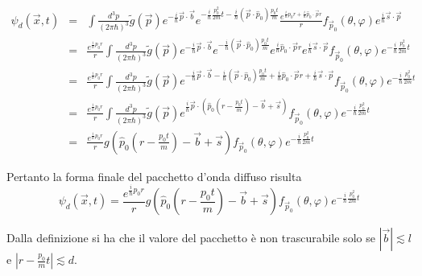 \documentclass[../../FisicaTeorica.tex]{subfiles}
\begin{document}
\begin{eqnarray*}
  \psi_d (\vec{x}, t) & = & \int \frac{d^3 p}{(2 \pi \hbar)^3}  \tilde{g}
  (\vec{p}) e^{- \frac{i}{\hbar} \vec{p} \cdot \vec{b}} e^{- \frac{i}{\hbar} 
  \frac{p_0^2}{2 m} t - \frac{i}{\hbar}  (\vec{p} \cdot \hat{p}_0) \frac{p_0
  t}{m}}  \frac{e^{\frac{i}{\hbar} p_0 r + \frac{i}{\hbar}  \hat{p}_0 \cdot
  \vec{p} r}}{r}  f_{\vec{p}_0} (\theta, \varphi) e^{\frac{i}{\hbar} \vec{s}
  \cdot \vec{p}}\\
  & = & \frac{e^{\frac{i}{\hbar} p_0 r}}{r} \int \frac{d^3 p}{(2 \pi
  \hbar)^3}  \tilde{g} (\vec{p}) e^{- \frac{i}{\hbar} \vec{p} \cdot \vec{b}}
  e^{- \frac{i}{\hbar}  (\vec{p} \cdot \hat{p}_0) \frac{p_0 t}{m}}
  e^{\frac{i}{\hbar}  \hat{p}_0 \cdot \vec{p} r} e^{\frac{i}{\hbar} \vec{s}
  \cdot \vec{p}} f_{\vec{p}_0} (\theta, \varphi) e^{- \frac{i}{\hbar} 
  \frac{p_0^2}{2 m} t}\\
  & = & \frac{e^{\frac{i}{\hbar} p_0 r}}{r} \int \frac{d^3 p}{(2 \pi
  \hbar)^3}  \tilde{g} (\vec{p}) e^{- \frac{i}{\hbar} \vec{p} \cdot \vec{b} -
  \frac{i}{\hbar}  (\vec{p} \cdot \hat{p}_0) \frac{p_0 t}{m} + \frac{i}{\hbar}
  \hat{p}_0 \cdot \vec{p} r + \frac{i}{\hbar} \vec{s} \cdot \vec{p}} 
  f_{\vec{p}_0} (\theta, \varphi) e^{- \frac{i}{\hbar}  \frac{p_0^2}{2 m} t}\\
  & = & \frac{e^{\frac{i}{\hbar} p_0 r}}{r} \int \frac{d^3 p}{(2 \pi
  \hbar)^3}  \tilde{g} (\vec{p}) e^{\frac{i}{\hbar} \vec{p} \cdot \left(
  \hat{p}_0  \left( r - \frac{p_0 t}{m} \right) - \vec{b} + \vec{s} \right)} 
  f_{\vec{p}_0} (\theta, \varphi) e^{- \frac{i}{\hbar}  \frac{p_0^2}{2 m} t}\\
  & = & \frac{e^{\frac{i}{\hbar} p_0 r}}{r} g \left( \hat{p}_0  \left( r -
  \frac{p_0 t}{m} \right) - \vec{b} + \vec{s} \right)  f_{\vec{p}_0} (\theta,
  \varphi) e^{- \frac{i}{\hbar}  \frac{p_0^2}{2 m} t}
\end{eqnarray*}
\endgroup

Pertanto la forma finale del pacchetto d'onda diffuso risulta
\begin{equation}
\label{pacchettodiffuso}
\psi_d(\vec x, t) = \frac{e^{\frac{i}{\hbar} p_0 r}}{r} g \left( \hat{p}_0  \left( r -
  \frac{p_0 t}{m} \right) - \vec{b} + \vec{s} \right)  f_{\vec{p}_0} (\theta,
  \varphi) e^{- \frac{i}{\hbar}  \frac{p_0^2}{2 m} t}
\end{equation}

Dalla definizione si ha che il valore del pacchetto {\`e} non trascurabile
solo se $| \vec{b} | \lesssim l$ e $\left| r - \frac{p_0}{m} t \right|
\lesssim d$.
\end{document}
